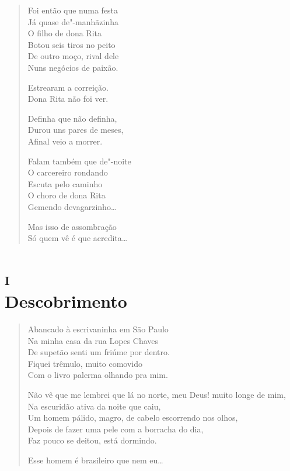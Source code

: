 \begin{verse}
Foi então que numa festa\\
Já quase de"-manhãzinha\\
O filho de dona Rita\\
Botou seis tiros no peito\\
De outro moço, rival dele\\
Nuns negócios de paixão.

Estrearam a correição.\\
Dona Rita não foi ver.

Definha que não definha,\\
Durou uns pares de meses,\\
Afinal veio a morrer.

Falam também que de"-noite\\
O carcereiro rondando\\
Escuta pelo caminho\\
O choro de dona Rita\\
Gemendo devagarzinho\ldots{}

Mas isso de assombração\\
Só quem vê é que acredita\ldots{}
\end{verse}

\chapter[Descobrimento]{\textsc{i}\\Descobrimento}



\begin{verse}
Abancado à escrivaninha em São Paulo\\
Na minha casa da rua Lopes Chaves\\
De supetão senti um friúme por dentro.\\
Fiquei trêmulo, muito comovido\\
Com o livro palerma olhando pra mim.

Não vê que me lembrei que lá no norte, meu Deus! muito longe de mim,\\
Na escuridão ativa da noite que caiu,\\
Um homem pálido, magro, de cabelo escorrendo nos olhos,\\
Depois de fazer uma pele com a borracha do dia,\\
Faz pouco se deitou, está dormindo.

Esse homem é brasileiro que nem eu\ldots{}
\end{verse}

